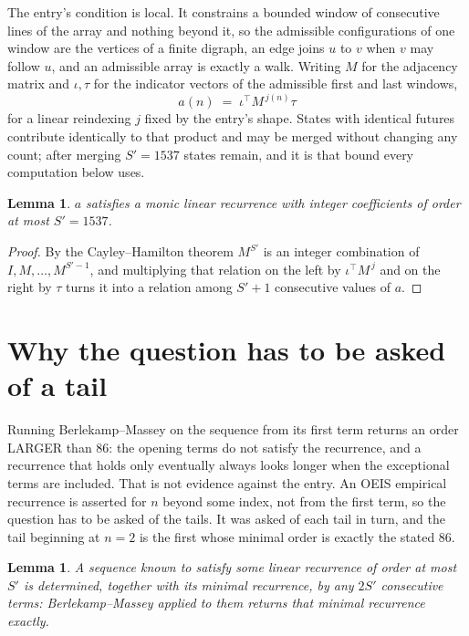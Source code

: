 \documentclass[11pt,a4paper]{article}
\theoremstyle{plain}
\newtheorem{lemma}[theorem]{Lemma}
\theoremstyle{definition}
\begin{document}
The entry's condition is local. It constrains a bounded window of consecutive lines of the
array and nothing beyond it, so the admissible configurations of one window are the vertices of
a finite digraph, an edge joins $u$ to $v$ when $v$ may follow $u$, and an admissible array is
exactly a walk. Writing $M$ for the adjacency matrix and $\iota,\tau$ for the indicator vectors
of the admissible first and last windows,
\[
a(n)\;=\;\iota^{\!\top}M^{\,j(n)}\tau
\]
for a linear reindexing $j$ fixed by the entry's shape. States with identical futures
contribute identically to that product and may be merged without changing any count; after
merging $S'=1537$ states remain, and it is that bound every computation below uses.

\begin{lemma}\label{lem:cf}
$a$ satisfies a monic linear recurrence with integer coefficients of order at most $S'=1537$.
\end{lemma}

\begin{proof}
By the Cayley--Hamilton theorem $M^{S'}$ is an integer combination of $I,M,\dots,M^{S'-1}$,
and multiplying that relation on the left by $\iota^{\!\top}M^{\,j}$ and on the right by
$\tau$ turns it into a relation among $S'+1$ consecutive values of $a$.
\end{proof}

\section{Why the question has to be asked of a tail}

Running Berlekamp--Massey on the sequence from its first term returns an order LARGER than $86$: the opening terms do not satisfy the recurrence, and a recurrence that holds only eventually always looks longer when the exceptional terms are included. That is not evidence against the entry. An OEIS empirical recurrence is asserted for $n$ beyond some index, not from the first term, so the question has to be asked of the tails. It was asked of each tail in turn, and the tail beginning at $n=2$ is the first whose minimal order is exactly the stated $86$.

\begin{lemma}\label{lem:bm}
A sequence known to satisfy some linear recurrence of order at most $S'$ is determined,
together with its minimal recurrence, by any $2S'$ consecutive terms: Berlekamp--Massey applied
to them returns that minimal recurrence exactly.
\end{lemma}
\end{document}
